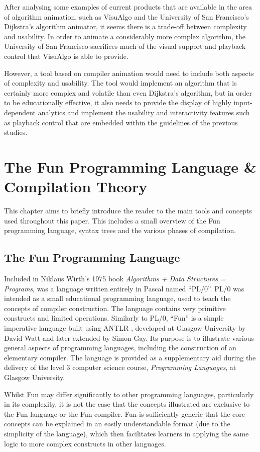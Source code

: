 \documentclass{l4proj}
\begin{document}
After analysing some examples of current products that are available in the area of algorithm animation, such as VisuAlgo and the University of San Francisco's Dijkstra's algorithm animator, it seems there is a trade-off between complexity and usability. In order to animate a considerably more complex algorithm, the University of San Francisco sacrifices much of the visual support and playback control that VisuAlgo is able to provide. 

However, a tool based on compiler animation would need to include both aspects of complexity and usability. The tool would implement an algorithm that is certainly more complex and volatile than even Dijkstra's algorithm, but in order to be educationally effective, it also needs to provide the display of highly input-dependent analytics and implement the usability and interactivity features such as playback control that are embedded within the guidelines of the previous studies.

\chapter{The Fun Programming Language \& Compilation Theory}
This chapter aims to briefly introduce the reader to the main tools and concepts used throughout this paper. This includes a small overview of the Fun programming language, syntax trees and the various phases of compilation.

\section{The Fun Programming Language}
Included in Niklaus Wirth's 1975 book {\it Algorithms + Data Structures = Programs}, was a language written entirely in Pascal named ``PL/0''. PL/0 was intended as a small educational programming language, used to teach the concepts of compiler construction. The language contains very primitive constructs and limited operations. Similarly to PL/0, ``Fun'' is a simple imperative language built using ANTLR \cite{antlr}, developed at Glasgow University by David Watt and later extended by Simon Gay. Its purpose is to illustrate various general aspects of programming languages, including the construction of an elementary compiler. The language is provided as a supplementary aid during the delivery of the level 3 computer science course, {\it Programming Languages}, at Glasgow University.

Whilst Fun may differ significantly to other programming languages, particularly in its complexity, it is not the case that the concepts illustrated are exclusive to the Fun language or the Fun compiler. Fun is sufficiently generic that the core concepts can be explained in an easily understandable format (due to the simplicity of the language), which then facilitates learners in applying the same logic to more complex constructs in other languages.
\end{document}
